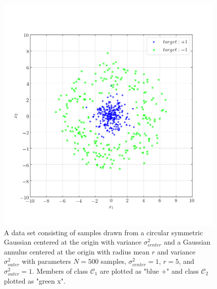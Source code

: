 \documentclass[conference]{IEEEtran}
\begin{document}
\begin{figure}[p!]
\centerline{\includegraphics[trim=0 0 0 0, clip, width=\columnwidth]{Figure_3.png}}
\caption{A data set consisting of samples drawn from a circular symmetric Gaussian centered at the origin with variance $\sigma^2_{center}$ and a Gaussian annulus centered at the origin with radius mean $r$ and variance $\sigma^2_{outer}$ with parameters $N=500$ samples, $\sigma^2_{center}=1$, $r=5$, and $\sigma^2_{outer}=1$. Members of class $\mathscr{C}_1$ are plotted as "blue +" and class $\mathscr{C}_2$ plotted as "green x".}
\label{fig:concentgauss}
\end{figure}
\end{document}
